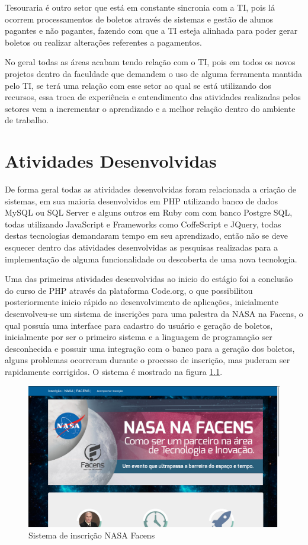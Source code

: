 \documentclass[
	12pt,				%
	oneside,			%
	a4paper,			%
	chapter=TITLE,		%
	section=TITLE,		%
	sumario=tradicional %
	english,			%
	french,				%
	spanish,			%
	brazil				%
	]{abntex2}
\begin{document}
Tesouraria é outro setor que está em constante sincronia com a TI, pois lá ocorrem processamentos de boletos através de sistemas e gestão de alunos pagantes e não pagantes, fazendo com que a TI esteja alinhada para poder gerar boletos ou realizar alterações referentes a pagamentos.

No geral todas as áreas acabam tendo relação com o TI, pois em todos os novos projetos dentro da faculdade que demandem o uso de alguma ferramenta mantida pelo TI, se terá uma relação com esse setor ao qual se está utilizando dos recursos, essa troca de experiência e entendimento das atividades realizadas pelos setores vem a incrementar o aprendizado e a melhor relação dentro do ambiente de trabalho. 

\chapter{Atividades Desenvolvidas}
\label{chap:chap5}
De forma geral todas as atividades desenvolvidas foram relacionada a criação de sistemas, em sua maioria desenvolvidos em PHP utilizando banco de dados MySQL ou SQL Server e alguns outros em Ruby com com banco Postgre SQL, todas utilizando JavaScript e Frameworks como CoffeScript e JQuery, todas destas tecnologias demandaram tempo em seu aprendizado, então não se deve esquecer dentro das atividades desenvolvidas as pesquisas realizadas para a implementação de alguma funcionalidade ou descoberta de uma nova tecnologia.

Uma das primeiras atividades desenvolvidas ao inicio do estágio foi a conclusão do curso de PHP através da plataforma Code.org, o que possibilitou posteriormente inicio rápido ao desenvolvimento de aplicações, inicialmente desenvolveu-se um sistema de inscrições para uma palestra da NASA na Facens, o qual possuía uma interface para cadastro do usuário e geração de boletos, inicialmente por ser o primeiro sistema e a linguagem de programação ser desconhecida e possuir uma integração com o banco para a geração dos boletos, alguns problemas ocorreram durante o processo de inscrição, mas puderam ser rapidamente corrigidos. O sistema é mostrado na figura \ref{fig:nasa}.

\begin{figure}[htb]
	\caption{\label{fig:nasa} Sistema de inscrição NASA Facens}
	\begin{center}
		\includegraphics[scale=0.3]{nasa}
	\end{center}
\end{figure}
\end{document}
